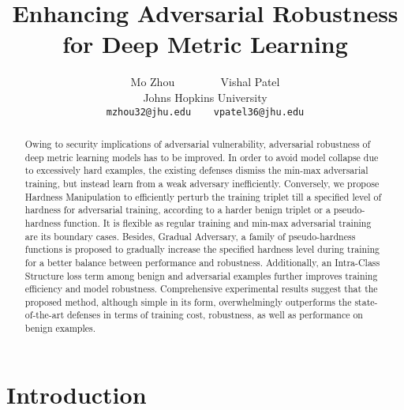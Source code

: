 \documentclass[10pt,twocolumn,letterpaper]{article}
\begin{document}
\title{Enhancing Adversarial Robustness for Deep Metric Learning}

\author{Mo Zhou ~~~~~~~ Vishal Patel\\
Johns Hopkins University\\
{\tt\small mzhou32@jhu.edu ~~ vpatel36@jhu.edu}
}
\maketitle

\begin{abstract}
	Owing to security implications of adversarial vulnerability, adversarial
	robustness of deep metric learning models has to be improved.
	In order to avoid model collapse due to excessively hard examples, the
	existing defenses dismiss the min-max adversarial training, but instead
	learn from a weak adversary inefficiently.
	Conversely, we propose Hardness Manipulation to efficiently perturb the
	training triplet till a specified level of hardness for adversarial
	training, according to a harder benign triplet or a pseudo-hardness
	function.
	It is flexible as regular training and min-max adversarial training
	are its boundary cases.
	Besides, Gradual Adversary, a family of pseudo-hardness functions is
	proposed to gradually increase the specified hardness level during training
	for a better balance between performance and robustness.
	Additionally, an Intra-Class Structure loss term among benign and adversarial
	examples further improves training efficiency and model robustness.
	Comprehensive experimental results suggest that the proposed method,
	although simple in its form, overwhelmingly outperforms the
	state-of-the-art defenses in terms of training cost,
	robustness, as well as performance on benign examples.
%
\end{abstract}

\section{Introduction}
\label{sec:1}
\end{document}
